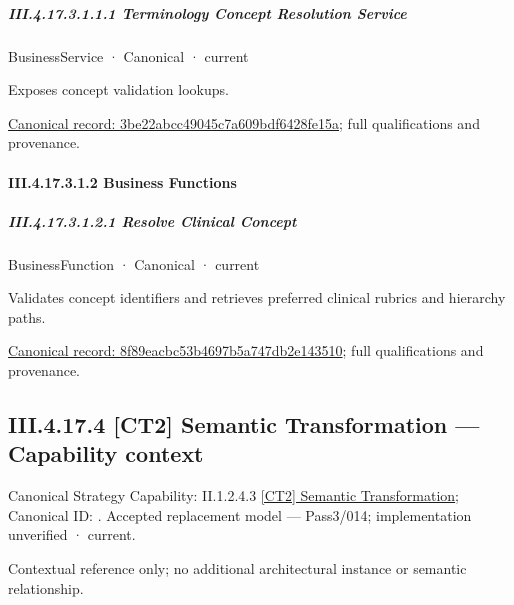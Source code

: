\subparagraph*{III.4.17.3.1.1.1 Terminology Concept Resolution Service}
\label{navigation:III.4.17.3.1.1.1}

\label{element:3be22abcc49045c7a609bdf6428fe15a}
{\small BusinessService · Canonical · current}\par

Exposes concept validation lookups.


{\footnotesize \href{../../../../../../../../continuum/business/business-service/3be22abcc49045c7a609bdf6428fe15a.md}{Canonical record: 3be22abcc49045c7a609bdf6428fe15a}; full qualifications and provenance.}\par
\paragraph*{III.4.17.3.1.2 Business Functions}
\label{navigation:III.4.17.3.1.2}

\subparagraph*{III.4.17.3.1.2.1 Resolve Clinical Concept}
\label{navigation:III.4.17.3.1.2.1}

\label{element:8f89eacbc53b4697b5a747db2e143510}
{\small BusinessFunction · Canonical · current}\par

Validates concept identifiers and retrieves preferred clinical rubrics and hierarchy paths.


{\footnotesize \href{../../../../../../../../continuum/business/business-function/8f89eacbc53b4697b5a747db2e143510.md}{Canonical record: 8f89eacbc53b4697b5a747db2e143510}; full qualifications and provenance.}\par
\subsection*{III.4.17.4 [CT2] Semantic Transformation — Capability context}
\label{navigation:III.4.17.4}

{\small Canonical Strategy Capability: II.1.2.4.3 \hyperref[element:75c038039b55453184cbf1e787120136]{[CT2] Semantic Transformation}; Canonical ID: \texttt{}. Accepted replacement model — Pass3/014; implementation unverified · current.}\par
Contextual reference only; no additional architectural instance or semantic relationship.\par
